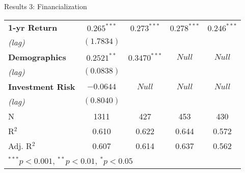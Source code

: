 \documentclass{beamer}
\begin{document}
\begin{frame}{\textmd{Results 3: Financialization}}
\begin{table}
\begin{tiny}
\begin{center}
\begin{tabular}{l c c c c }
\textbf{1-yr Return}                & $\mathbf{0.265^{***}}$  & $0.273^{***}$ & $0.278^{***}$  & $0.246^{***}$   \\
\hspace*{0.25cm} \emph{(lag)}& $(1.7834)$       &  & &         \\[0.4ex]
\textbf{Demographics} & $\mathbf{0.2521^{**}}$    & $0.3470^{***}$  & \color{gray}$Null$         & \color{gray}$Null$          \\
\hspace*{0.25cm} \emph{(lag)}& $(0.0838)$       &  & &         \\[0.4ex]
\textbf{Investment Risk}    & $-0.0644$        & \color{gray}$Null$         & \color{gray}$Null$          & \color{gray}$Null$          \\
\hspace*{0.25cm} \emph{(lag)}& $(0.8040)$       &  & &         \\[0.4ex]
\hline
N           & 1311           & 427             & 453            & 430            \\
R$^2$               & 0.610          & 0.622           & 0.644          & 0.572          \\
Adj. R$^2$          & 0.607          & 0.614           & 0.637          & 0.562          \\
\hline
\multicolumn{5}{l}{$^{***}p<0.001$, $^{**}p<0.01$, $^*p<0.05$}
\end{tabular}
\end{center}
\end{tiny}
\end{table}
\end{frame}
\end{document}
